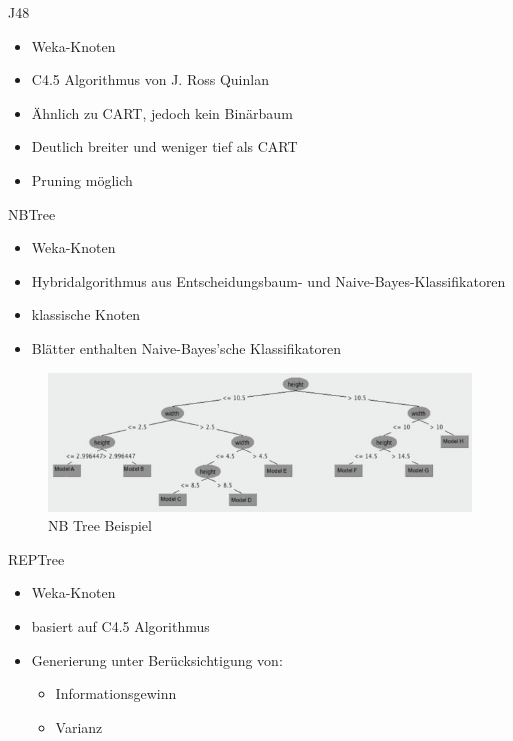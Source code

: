 \documentclass[
	handout,
  	aspectratio=169
]{beamer}
\begin{document}
		\begin{frame}{J48}		
			\begin{itemize}
				\item Weka-Knoten
				\item C4.5 Algorithmus von J. Ross Quinlan
				\item Ähnlich zu CART, jedoch kein Binärbaum
				\item Deutlich breiter und weniger tief als CART
				\item Pruning möglich
			\end{itemize}
		\end{frame}

		\begin{frame}{NBTree}
			\begin{itemize}
				\item Weka-Knoten
				\item Hybridalgorithmus aus Entscheidungsbaum- und Naive-Bayes-Klassifikatoren
				\item \glqq{}klassische\grqq{} Knoten
				\item Blätter enthalten Naive-Bayes’sche Klassifikatoren
			\end{itemize}	
			
			\begin{center}
				\begin{figure}[h]
					\includegraphics[scale=1]{../pictures/NBTree-classifying-MAC-Felinae.jpg}
					\caption{NB Tree Beispiel}		
				\end{figure}		
			\end{center}			
		\end{frame}

		\begin{frame}{REPTree}	
			\begin{itemize}
				\item Weka-Knoten
				\item basiert auf C4.5 Algorithmus
				\item Generierung unter Berücksichtigung von:
				\begin{itemize}
					\item Informationsgewinn
					\item Varianz
				\end{itemize}
			\end{itemize}	
		\end{frame}
\end{document}
